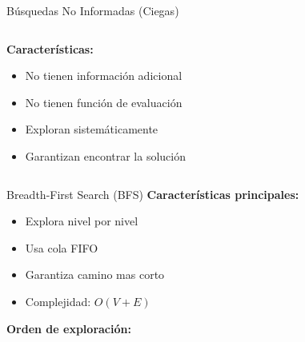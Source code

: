 \documentclass{beamer}
\begin{document}
\begin{frame}{Búsquedas No Informadas (Ciegas)}
    \begin{columns}
        \begin{column}{0.6\textwidth}
            \textbf{Características:}
            \begin{itemize}
                \item No tienen información adicional
                \item No tienen función de evaluación
                \item Exploran sistemáticamente
                \item Garantizan encontrar la solución
            \end{itemize}
        \end{column}
        \begin{column}{0.4\textwidth}
            \centering
            {\fontsize{60}{60}\selectfont \faBlind}
        \end{column}
    \end{columns}
\end{frame}

\begin{frame}{Breadth-First Search (BFS)}
    \textbf{Características principales:}
    \begin{itemize}
        \item Explora nivel por nivel
        \item Usa cola FIFO
        \item Garantiza camino mas corto
        \item Complejidad: $O(V + E)$
    \end{itemize}
    
    \vspace{0.5cm}
    
    \textbf{Orden de exploración:}
    \begin{center}
    \end{center}
\end{frame}
\end{document}
